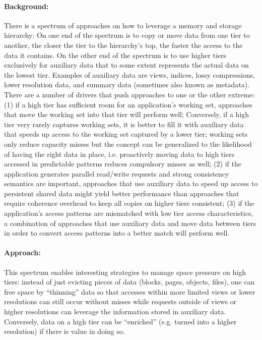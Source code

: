 \paragraph{Background:} There is a spectrum of approaches on how
to leverage a memory and storage hierarchy: On one end of the
spectrum is to copy or move data from one tier to another, the
closer the tier to the hierarchy's top, the faster the access to
the data it contains. On the other end of the spectrum is to use
higher tiers exclusively for auxiliary data that to some extent
represents the actual data on the lowest tier. Examples of auxiliary
data are views, indices, lossy compressions, lower resolution data,
and summary data (sometimes also known as metadata). There are a
number of drivers that push approaches to one or the other extreme:
(1) if a high tier has sufficient room for an application's working
set, approaches that move the working set into that tier will perform
well; Conversely, if a high tier very rarely captures working sets,
it is better to fill it with auxiliary data that speeds up access
to the working set captured by a lower tier; working sets only
reduce capacity misses but the concept can be generalized to the
likelihood of having the right data in place, i.e. proactively
moving data to high tiers accessed in predictable patterns reduces
compulsory misses as well; (2) if the application generates parallel
read/write requests and strong consistency semantics are important,
approaches that use auxiliary data to speed up access to persistent
shared data might yield better performance than approaches that
require coherence overhead to keep all copies on higher tiers
consistent; (3) if the application's access patterns are mismatched
with low tier access characteristics, a combination of approaches
that use auxiliary data and move data between tiers in order to
convert access patterns into a better match will perform well.


\paragraph{Approach:} This spectrum enables interesting strategies
to manage space pressure on high tiers: instead of just evicting
pieces of data (blocks, pages, objects, files), one can free space
by ``thinning'' data so that accesses within more limited views or
lower resolutions can still occur without misses while requests
outside of views or higher resolutions can leverage the information
stored in auxiliary data. Conversely, data on a high tier can be
``enriched'' (e.g. turned into a higher resolution) if there is
value in doing so.

